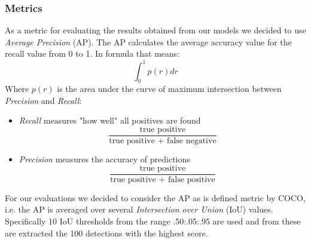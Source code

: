 \documentclass[10pt,twocolumn,letterpaper]{article}
\begin{document}
\subsubsection{Metrics}
As a metric for evaluating the results obtained from our models we decided to use \textit{Average Precision} (AP). The AP calculates the average accuracy value for the recall value from 0 to 1. In formula that means:
\begin{equation}
\int_0^1 p(r) dr 
\label{AP}
\end{equation}
\noindent
Where $p(r)$ is the area under the curve of maximum intersection between \textit{Precision} and \textit{Recall}:
\begin{itemize}
\item \textit{Recall} measures "how well" all positives are found
\begin{equation}
\frac{\text{true positive}}{\text{true positive + false negative}}
\end{equation}
\item \textit{Precision} measures the accuracy of predictions
\begin{equation}
\frac{\text{true positive}}{\text{true positive + false positive}}
\end{equation}
\end{itemize}
\noindent
For our evaluations we decided to consider the AP as is defined metric by COCO, i.e. the AP is averaged over several \textit{Intersection over Union} (IoU) values. Specifically 10 IoU thresholds from the range .50:.05:.95 are used and from these are extracted the 100 detections with the highest score.
\end{document}
